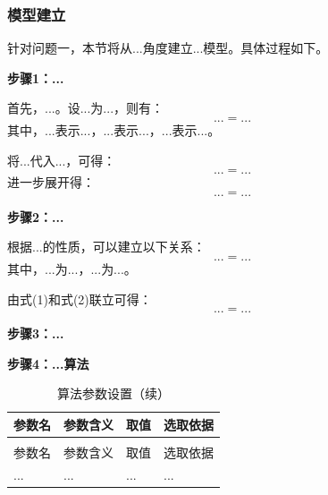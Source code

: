 
\subsubsection{模型建立}

针对问题一，本节将从...角度建立...模型。具体过程如下。

\textbf{步骤1：...}

首先，...。设...为...，则有：
\begin{equation}
    ... = ...
\end{equation}
其中，$...$表示...，$...$表示...，$...$表示...。

将...代入...，可得：
\begin{equation}
    ... = ...
\end{equation}
进一步展开得：
\begin{equation}
    ... = ...
\end{equation}

\textbf{步骤2：...}

根据...的性质，可以建立以下关系：
\begin{equation}
    ... = ...
\end{equation}
其中，$...$为...，$...$为...。

由式(1)和式(2)联立可得：
\begin{equation}
    ... = ...
\end{equation}

\textbf{步骤3：...}


\textbf{步骤4：...算法}


\begin{longtable}{>{\centering\arraybackslash}p{}>{\centering\arraybackslash}p{}>{\centering\arraybackslash}p{}>{\centering\arraybackslash}p{}}
  \caption{算法参数设置}
  \label{tab:参数1} \\
  \toprule
  参数名 & 参数含义 & 取值 & 选取依据 \\
  \midrule
  \endfirsthead
  \caption{算法参数设置（续）} \\
  \toprule
  参数名 & 参数含义 & 取值 & 选取依据 \\
  \midrule
  \endhead
  \bottomrule
  \endfoot
  ... & ... & ... & ... \\
\end{longtable}

